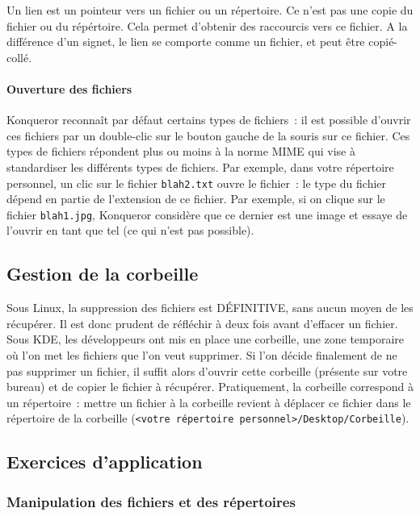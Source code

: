 \documentclass[12pt,a4paper]{article}
\begin{document}
Un lien est un pointeur vers un fichier ou un répertoire. Ce n'est pas
une copie du fichier ou du répértoire. Cela permet d'obtenir des
raccourcis vers ce fichier. A la différence d'un signet, le lien se
comporte comme un fichier, et peut être copié-collé.

\paragraph{Ouverture des fichiers\\}
Konqueror reconnaît par défaut certains types de fichiers~: il est
possible d'ouvrir ces fichiers par un double-clic sur le bouton gauche
de la souris sur ce fichier. Ces types de fichiers répondent plus ou
moins à la norme MIME qui vise à standardiser les différents types de
fichiers. Par exemple, dans votre répertoire personnel, un clic sur
le fichier {\tt blah2.txt} ouvre le fichier~: le type du fichier
dépend en partie de l'extension de ce fichier. Par exemple, si on
clique sur le fichier {\tt blah1.jpg}, Konqueror considère que ce
dernier est une image et essaye de l'ouvrir en tant que tel (ce qui
n'est pas possible). 

\subsection{Gestion de la corbeille}
   Sous Linux, la suppression des fichiers est DÉFINITIVE, sans aucun
   moyen de les récupérer. Il est donc prudent de réfléchir à deux
   fois avant d'effacer un fichier. Sous KDE, les développeurs ont mis
   en place une corbeille, une zone temporaire où l'on met les
   fichiers que l'on veut supprimer. Si l'on décide finalement de ne
   pas supprimer un fichier, il suffit alors d'ouvrir cette corbeille
   (présente sur votre bureau) et de copier le fichier à
   récupérer. Pratiquement, la corbeille correspond à un répertoire~:
   mettre un fichier à la corbeille revient à déplacer ce fichier dans
   le répertoire de la corbeille ({\tt <votre répertoire
     personnel>/Desktop/Corbeille}). 



\subsection{Exercices d'application}
\subsubsection{Manipulation des fichiers et des répertoires}
\end{document}
